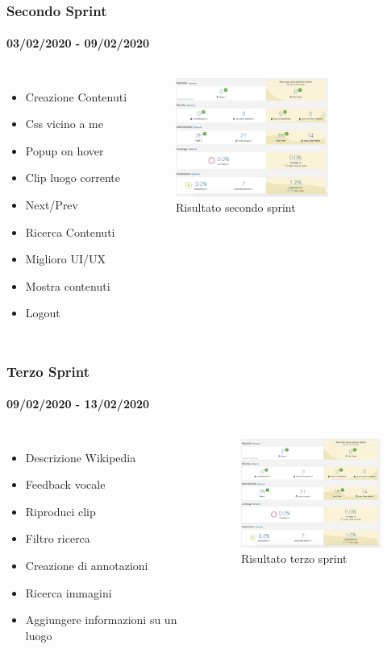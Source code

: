 \documentclass{beamer}
\begin{document}
\begin{frame}
\frametitle{Secondo Sprint}
\framesubtitle{03/02/2020 - 09/02/2020}
\begin{columns}
  \begin{itemize}
	\item Creazione Contenuti
	\item Css vicino a me
	\item Popup on hover
	\item Clip luogo corrente
	\item Next/Prev
	\item Ricerca Contenuti
	\item Miglioro UI/UX
	\item Mostra contenuti
	\item Logout
  \end{itemize}
	\begin{figure}[h]
        \includegraphics[width=5cm]{Images/SonarQube/terzo-sprint.png}
        \caption{Risultato secondo sprint}
   \end{figure}
\end{columns}
\end{frame}

\begin{frame}
\frametitle{Terzo Sprint}
\framesubtitle{09/02/2020 - 13/02/2020}
\begin{columns}
  \begin{itemize}
	\item Descrizione Wikipedia
	\item Feedback vocale
	\item Riproduci clip
	\item Filtro ricerca
	\item Creazione di annotazioni
	\item Ricerca immagini
	\item Aggiungere informazioni su un luogo
  \end{itemize}
	\begin{figure}[h]
        \includegraphics[width=5cm]{Images/SonarQube/terzo-sprint.png}
        \caption{Risultato terzo sprint}
   \end{figure}
\end{columns}
\end{frame}
\end{document}
